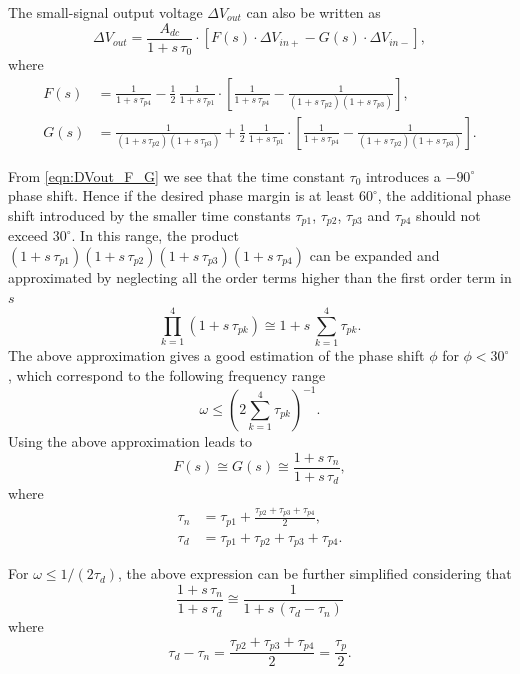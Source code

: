 \documentclass[
  a4paper,
  DIV=11,
  numbers=noendperiod]{scrreprt}
\begin{document}
The small-signal output voltage \(\Delta V_{out}\) can also be written
as \begin{equation}\label{eqn:DVout_F_G}
  \Delta V_{out} = \frac{A_{dc}}{1+s\,\tau_0} \cdot \left[F(s) \cdot \Delta V_{in+} - G(s) \cdot \Delta V_{in-}\right],
\end{equation} where \begin{align}
  F(s) &= \frac{1}{1+s\,\tau_{p4}} - \frac{1}{2}\,\frac{1}{1+s\,\tau_{p1}} \cdot \left[\frac{1}{1+s\,\tau_{p4}} - \frac{1}{(1+s\,\tau_{p2})(1+s\,\tau_{p3})}\right],\\
  G(s) &= \frac{1}{(1+s\,\tau_{p2})(1+s\,\tau_{p3})} + \frac{1}{2}\,\frac{1}{1+s\,\tau_{p1}} \cdot \left[\frac{1}{1+s\,\tau_{p4}} - \frac{1}{(1+s\,\tau_{p2})(1+s\,\tau_{p3})}\right].
\end{align}

From \eqref{eqn:DVout_F_G} we see that the time constant \(\tau_0\)
introduces a \(-90^\circ\) phase shift. Hence if the desired phase
margin is at least \(60^\circ\), the additional phase shift introduced
by the smaller time constants \(\tau_{p1}\), \(\tau_{p2}\),
\(\tau_{p3}\) and \(\tau_{p4}\) should not exceed \(30^\circ\). In this
range, the product
\((1+s\,\tau_{p1})(1+s\,\tau_{p2})(1+s\,\tau_{p3})(1+s\,\tau_{p4})\) can
be expanded and approximated by neglecting all the order terms higher
than the first order term in \(s\) \begin{equation}
  \prod_{k=1}^{4} (1+s\,\tau_{pk}) \cong 1 + s \, \sum_{k=1}^{4} \tau_{pk}.
\end{equation} The above approximation gives a good estimation of the
phase shift \(\phi\) for \(\phi < 30^\circ\), which correspond to the
following frequency range \begin{equation}
  \omega \leq \left(2\sum_{k=1}^{4} \tau_{pk}\right)^{-1}.
\end{equation} Using the above approximation leads to \begin{equation}
  F(s) \cong G(s) \cong \frac{1+s\,\tau_n}{1 + s\,\tau_d},
\end{equation} where \begin{align}
  \tau_n &= \tau_{p1} + \frac{\tau_{p2}+\tau_{p3}+\tau_{p4}}{2},\\
  \tau_d &= \tau_{p1}+\tau_{p2}+\tau_{p3}+\tau_{p4}.
\end{align}

For \(\omega \leq 1/(2 \tau_d)\), the above expression can be further
simplified considering that \begin{equation}
  \frac{1+s\,\tau_n}{1 + s\,\tau_d} \cong \frac{1}{1 + s\,(\tau_d-\tau_n)}
\end{equation} where \begin{equation}
  \tau_d-\tau_n = \frac{\tau_{p2}+\tau_{p3}+\tau_{p4}}{2} = \frac{\tau_p}{2}.
\end{equation}
\end{document}
